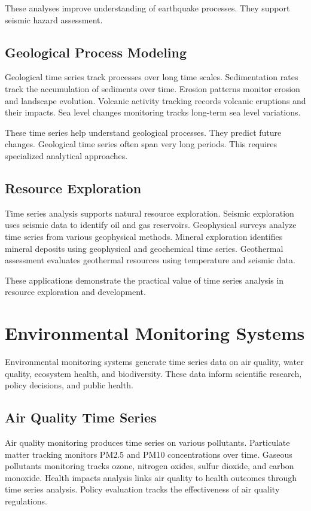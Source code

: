 These analyses improve understanding of earthquake processes. They support seismic hazard assessment.

\subsection{Geological Process Modeling}

Geological time series track processes over long time scales. Sedimentation rates track the accumulation of sediments over time. Erosion patterns monitor erosion and landscape evolution. Volcanic activity tracking records volcanic eruptions and their impacts. Sea level changes monitoring tracks long-term sea level variations.

These time series help understand geological processes. They predict future changes. Geological time series often span very long periods. This requires specialized analytical approaches.

\subsection{Resource Exploration}

Time series analysis supports natural resource exploration. Seismic exploration uses seismic data to identify oil and gas reservoirs. Geophysical surveys analyze time series from various geophysical methods. Mineral exploration identifies mineral deposits using geophysical and geochemical time series. Geothermal assessment evaluates geothermal resources using temperature and seismic data.

These applications demonstrate the practical value of time series analysis in resource exploration and development.

\section{Environmental Monitoring Systems}

Environmental monitoring systems generate time series data on air quality, water quality, ecosystem health, and biodiversity. These data inform scientific research, policy decisions, and public health.

\subsection{Air Quality Time Series}

Air quality monitoring produces time series on various pollutants. Particulate matter tracking monitors PM2.5 and PM10 concentrations over time. Gaseous pollutants monitoring tracks ozone, nitrogen oxides, sulfur dioxide, and carbon monoxide. Health impacts analysis links air quality to health outcomes through time series analysis. Policy evaluation tracks the effectiveness of air quality regulations.

